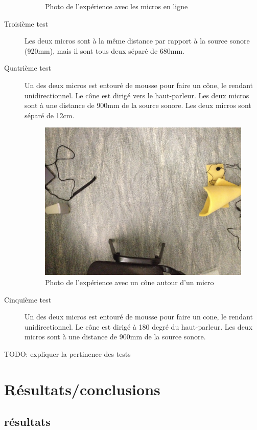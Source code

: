 \documentclass[12pt,a4paper]{report}
\begin{document}
\begin{description}
\begin{figure}[H]
	\caption{Photo de l'expérience avec les micros en ligne}
	\end{figure}
\item[Troisième test] Les deux micros sont à la même distance par rapport à la source sonore (920mm), mais il sont tous deux séparé de 680mm.
\item[Quatrième test] Un des deux micros est entouré de mousse pour faire un cône, le rendant unidirectionnel. Le cône est dirigé vers le haut-parleur. Les deux micros sont à une distance de 900mm de la source sonore. Les deux micros sont séparé de 12cm.
	\begin{figure}[H]
	\includegraphics[width=\textwidth]{../tests/lecture_de_signaux_carres/donnees11-03/test_4.jpg} 
	\caption{Photo de l'expérience avec un cône autour d'un micro}
	\end{figure}
\item[Cinquième test]	Un des deux micros est entouré de mousse pour faire un cone, le rendant unidirectionnel. Le cône est dirigé à 180 degré du haut-parleur. Les deux micros sont à une distance de 900mm de la source sonore.
\end{description}

\begin{huge}
TODO: expliquer la pertinence des tests
\end{huge}

\section{Résultats/conclusions}
\subsection{résultats}
\end{document}

